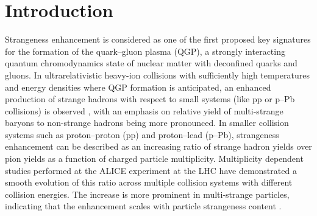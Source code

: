 \section{Introduction}

Strangeness enhancement is considered as one of the first proposed key signatures \cite{Muller:1982} for the formation of the quark--gluon plasma 
(QGP), a strongly interacting quantum chromodynamics state of nuclear matter with deconfined quarks and gluons. In ultrarelativistic heavy-ion 
collisions with sufficiently high temperatures and energy densities where QGP formation is anticipated, an enhanced production of strange hadrons 
with respect to small systems (like pp or p--Pb collisions) is observed \cite{WA97:1999uwz, STAR:2008, PbPb276:2014}, with an emphasis on relative 
yield of multi-strange baryons to non-strange hadrons being more pronounced.
In smaller collision systems such as proton--proton (pp) and proton--lead (p--Pb), strangeness enhancement can be described as an increasing ratio 
of strange hadron yields over pion yields as a function of charged particle multiplicity. Multiplicity dependent studies performed at the ALICE 
experiment at the LHC have demonstrated a smooth evolution of this ratio across multiple collision systems with different collision energies. 
The increase is more prominent in multi-strange particles, indicating that the enhancement scales with particle strangeness content \cite{Nature:2017}. 